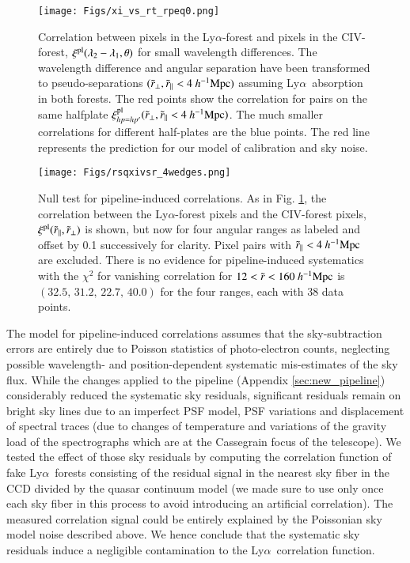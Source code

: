 \documentclass{aa}
\newcommand{\xipl}{\xi^{\rm pl}}
\newcommand{\hMpc}{h^{-1}{\rm Mpc}}
\newcommand{\lya}{Ly$\alpha$}
\newcommand{\Lya}{Ly$\alpha$~}
\newcommand{\rperppseudo}{\tilde{r}_\perp}
\newcommand{\rparpseudo}{\tilde{r}_\parallel}
\begin{document}
\begin{figure}[t]
\begin{center}
\texttt{[image: Figs/xi\_vs\_rt\_rpeq0.png]}
\caption{
  Correlation between pixels in the \lya-forest and pixels in the
  CIV-forest, $\xipl(\lambda_2-\lambda_1,\theta)$ for small wavelength
  differences.  The wavelength difference and angular separation have
  been transformed to pseudo-separations
$(\rperppseudo,\rparpseudo<4~\hMpc)$
  assuming \Lya absorption
  in both forests.
  The red points show the correlation for pairs on the same halfplate
$\xipl_{hp=hp^\prime}(\rperppseudo,\rparpseudo<4~\hMpc)$.
The much smaller correlations for different half-plates are the blue points.
The red line represents the prediction for our model of calibration
and sky  noise.
}
\label{xihzlzrpeq10_dif_same_halfplates}
\end{center}
\end{figure}

\begin{figure}[t]
\begin{center}
\texttt{[image: Figs/rsqxivsr\_4wedges.png]}
\caption{
  Null test for pipeline-induced correlations.
   As in Fig. \ref{xihzlzrpeq10_dif_same_halfplates}, the 
correlation between the \lya-forest pixels and the CIV-forest pixels,
$\xipl(\rparpseudo,\rperppseudo)$ is shown, but now 
for four angular ranges as labeled and offset by 0.1 successively for clarity.
Pixel pairs with $\rparpseudo<4~\hMpc$ are excluded.
There is no evidence for pipeline-induced systematics with
the $\chi^2$ for vanishing correlation
for $12<\tilde{r}<160~\hMpc$ is $(32.5,\,31.2,\,22.7,\,40.0)$ for the
four ranges, each with 38 data points.
  }
\label{crosscorrhizlzfig}
\end{center}
\end{figure}



The model for pipeline-induced correlations assumes
that the sky-subtraction errors are entirely due to
Poisson statistics of photo-electron counts,
neglecting possible wavelength- and position-dependent systematic
mis-estimates of the sky flux.
While
the changes applied to the pipeline (Appendix \ref{sec:new_pipeline}) 
considerably reduced the systematic sky residuals, 
significant residuals remain on bright sky lines due to an 
imperfect PSF model, PSF variations and displacement of spectral 
traces (due to changes of temperature and variations of the gravity 
load of the spectrographs which are at the Cassegrain focus of the telescope). 
We tested the effect of those sky residuals by computing the 
correlation function of fake \Lya forests consisting of the residual 
signal in the nearest sky fiber in the CCD  divided by the quasar continuum 
model (we made sure to use only once each sky fiber in this process to 
avoid introducing an artificial correlation). The measured correlation signal 
could be entirely explained by the
Poissonian sky model noise described above. 
We hence conclude that the systematic sky residuals induce a negligible 
contamination to the \Lya correlation function. 
\end{document}
